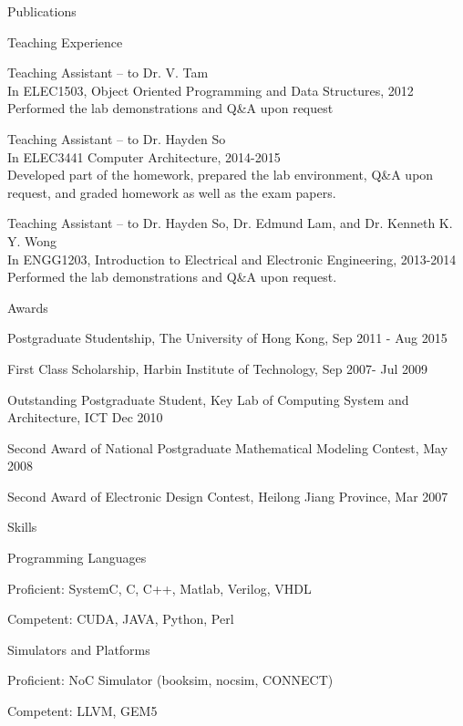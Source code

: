 \documentclass{resume} %
\begin{document}
\begin{rSection}{Publications}
\end{rSection}

\begin{rSection}{Teaching Experience}
\item Teaching Assistant – to Dr. V. Tam \\In ELEC1503, Object Oriented Programming 
and Data Structures, 2012 \\Performed the lab demonstrations and Q\&A upon request

\item Teaching Assistant – to Dr. Hayden So \\In ELEC3441 Computer Architecture, 2014-2015
\\Developed part of the homework, prepared the lab environment, Q\&A upon request, and graded homework as well as the exam papers.

\item Teaching Assistant – to Dr. Hayden So, Dr. Edmund Lam, and Dr. Kenneth K. Y. Wong 
\\In ENGG1203, Introduction to Electrical and Electronic Engineering, 2013-2014
\\Performed the lab demonstrations and Q\&A upon request. 

\end{rSection}

\begin{rSection}{Awards}
    \vspace{-1em}
\item Postgraduate Studentship, The University of Hong Kong, Sep 2011 - Aug 2015 
    \vspace{-0.5em}
\item First Class Scholarship, Harbin Institute of Technology, Sep 2007- Jul 2009
    \vspace{-0.5em}
\item Outstanding Postgraduate Student, Key Lab of Computing System and Architecture, ICT Dec 2010
    \vspace{-0.5em}
\item Second Award of National Postgraduate Mathematical Modeling Contest, May 2008
    \vspace{-0.5em}
\item Second Award of Electronic Design Contest, Heilong Jiang Province, Mar 2007
    \vspace{-0.5em}
\end{rSection}

\begin{rSection}{Skills}
    \begin{rSubsection}{Programming Languages}{}{}{}
    \item Proficient: SystemC, C, C++, Matlab, Verilog, VHDL
    \item Competent: CUDA, JAVA, Python, Perl
    \end{rSubsection}
    \begin{rSubsection}{Simulators and Platforms}{}{}{}
    \item Proficient: NoC Simulator (booksim, nocsim, CONNECT)
    \item Competent: LLVM, GEM5
    \end{rSubsection}
\end{rSection}
\end{document}
